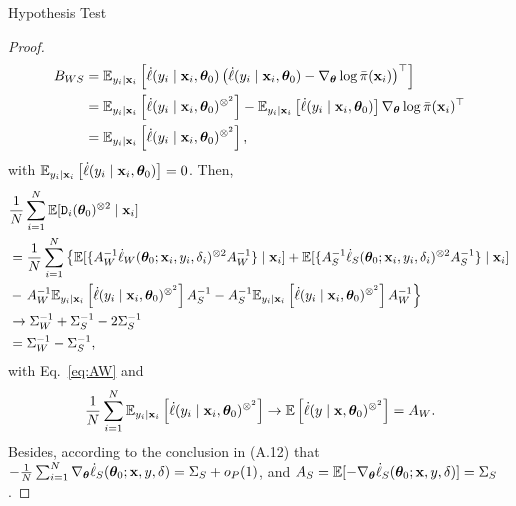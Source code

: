 \documentclass[12pt,hidelinks]{article}
\begin{document}
\begin{section}{Hypothesis Test}
\begin{proof}
\begin{align}
    \notag
    B_{WS} &= \mathbb{E}_{y_i\mid \mathbf{x}_i} \left[ \dot \ell(y_i\mid \mathbf{x}_i,\bm{\theta}_0) \left( \dot \ell(y_i\mid \mathbf{x}_i,\bm{\theta}_0) - \nabla_{\bm{\theta}} \log \bar{\pi}(\mathbf{x}_i)  \right)^\top \right] \\ \notag
    &= \mathbb{E}_{y_i\mid \mathbf{x}_i} \left[ \dot \ell(y_i\mid \mathbf{x}_i,\bm{\theta}_0)^{\otimes^2} \right] - \mathbb{E}_{y_i\mid \mathbf{x}_i} \left[ \dot \ell(y_i\mid \mathbf{x}_i,\bm{\theta}_0) \right] \nabla_{\bm{\theta}} \log \bar{\pi}(\mathbf{x}_i)^\top  \\ \notag
    &= \mathbb{E}_{y_i\mid \mathbf{x}_i} \left[ \dot \ell(y_i\mid \mathbf{x}_i,\bm{\theta}_0)^{\otimes^2} \right] ,
\end{align}
with $\mathbb{E}_{y_i\mid \mathbf{x}_i} \left[ \dot \ell(y_i\mid \mathbf{x}_i,\bm{\theta}_0) \right]=0$.
Then,
\begin{align}
    & \frac{1}{N} \sum_{i=1}^{N} \mathbb{E}[\mathtt{D}_i(\bm{\theta}_0) ^{\otimes 2} \mid \mathbf{x}_i] \notag \\
    &= \frac{1}{N} \sum_{i=1}^{N} \left\{ \mathbb{E}[\{A_W^{-1} \dot \ell_W (\bm{\theta}_0; \mathbf{x}_i, y_i, \delta_i)^{\otimes 2} A_W^{-1} \} \mid \mathbf{x}_i] + \mathbb{E}[\{ A_S^{-1} \dot \ell_S (\bm{\theta}_0; \mathbf{x}_i, y_i, \delta_i)^{\otimes 2} A_S^{-1} \} \mid \mathbf{x}_i] \right. \notag \\
     &- \left. A_W^{-1} \mathbb{E}_{y_i\mid \mathbf{x}_i} \left[ \dot \ell(y_i\mid \mathbf{x}_i,\bm{\theta}_0)^{\otimes^2} \right] A_S^{-1} -  A_S^{-1} \mathbb{E}_{y_i\mid \mathbf{x}_i} \left[ \dot \ell(y_i\mid \mathbf{x}_i,\bm{\theta}_0)^{\otimes^2} \right] A_W^{-1}\right\} \notag \\
    & \rightarrow \Sigma_W^{-1} + \Sigma_S^{-1} - 2 \Sigma_S^{-1} \notag \\
    &= \Sigma_W^{-1} -\Sigma_S^{-1},
\end{align}
with Eq.~\ref{eq:AW} and
\begin{align}
    \frac{1}{N} \sum_{i=1}^{N} \mathbb{E}_{y_i\mid \mathbf{x}_i} \left[ \dot \ell(y_i\mid \mathbf{x}_i,\bm{\theta}_0)^{\otimes^2} \right] \rightarrow  \mathbb{E} \left[ \dot \ell(y \mid \mathbf{x},\bm{\theta}_0)^{\otimes^2} \right] = A_W.
\end{align} 
Besides, according to the conclusion in \cite{wang2022maximum} (A.12) that $-\frac{1}{N} \sum_{i=1}^{N} \nabla_{\bm{\theta}} \dot \ell_S(\bm{\theta}_0; \mathbf{x}, y, \delta) = \Sigma_S + o_{P}(1)$,
and $A_S  = \mathbb{E} [-\nabla_{\bm{\theta}} \dot \ell_S(\bm{\theta}_0; \mathbf{x}, y, \delta)] = \Sigma_S$.


\end{proof}
\end{section}
\end{document}
